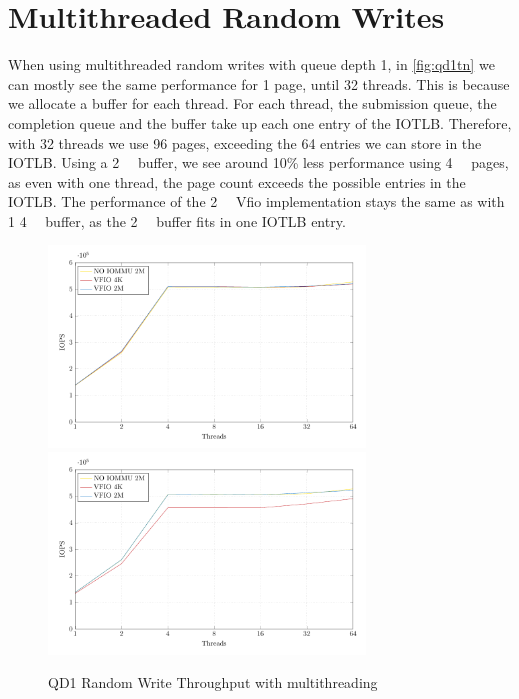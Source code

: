 \section{Multithreaded Random Writes}
When using multithreaded random writes with queue depth 1, in \autoref{fig:qd1tn} we can mostly see the same performance for 1 page, until 32 threads. This is because we allocate a buffer for each thread. For each thread, the submission queue, the completion queue and the buffer take up each one entry of the IOTLB. Therefore, with 32 threads we use 96 pages, exceeding the 64 entries we can store in the IOTLB. Using a \qty{2}{\mebi\byte} buffer, we see around 10\% less performance using \qty{4}{\kibi\byte} pages, as even with one thread, the page count exceeds the possible entries in the IOTLB. The performance of the \qty{2}{\mebi\byte} Vfio implementation stays the same as with 1 \qty{4}{\kibi\byte} buffer, as the \qty{2}{\mebi\byte} buffer fits in one IOTLB entry.


\begin{figure}
  \centering
   {\includegraphics[width=0.75\textwidth]{figures/qd1tn_1page}}
   {\includegraphics[width=0.75\textwidth]{figures/qd1tn_512page}}
  \caption{QD1 Random Write Throughput with multithreading}
  \label{fig:qd1tn}
\end{figure}

